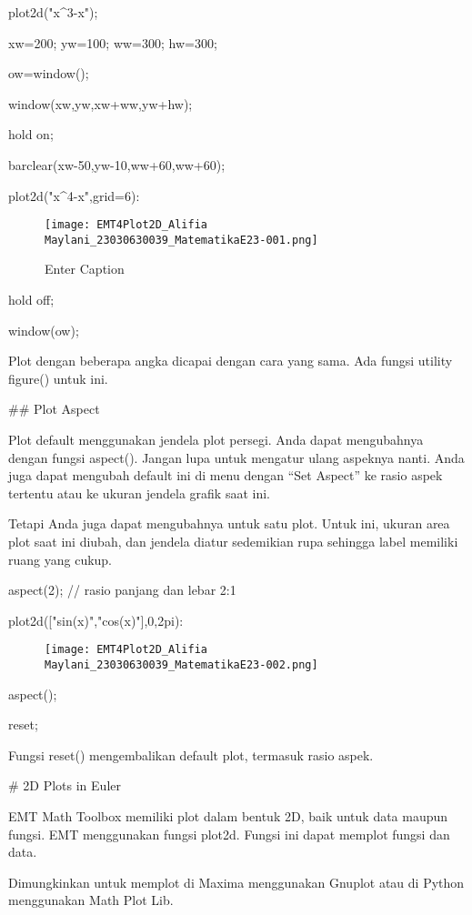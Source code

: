 \documentclass{article}
\begin{document}
\>plot2d("x^3-x");

\>xw=200; yw=100; ww=300; hw=300;

\>ow=window();

\>window(xw,yw,xw+ww,yw+hw);

\>hold on;

\>barclear(xw-50,yw-10,ww+60,ww+60);

\>plot2d("x^4-x",grid=6):

\begin{figure}
    \centering
    \texttt{[image: EMT4Plot2D\_Alifia Maylani\_23030630039\_MatematikaE23-001.png]}
    \caption{Enter Caption}
    \label{fig:enter-label}
\end{figure}


\>hold off;

\>window(ow);


Plot dengan beberapa angka dicapai dengan cara yang sama. Ada fungsi
utility figure() untuk ini.


## Plot Aspect

Plot default menggunakan jendela plot persegi. Anda dapat mengubahnya
dengan fungsi aspect(). Jangan lupa untuk mengatur ulang aspeknya
nanti. Anda juga dapat mengubah default ini di menu dengan “Set
Aspect” ke rasio aspek tertentu atau ke ukuran jendela grafik saat
ini.


Tetapi Anda juga dapat mengubahnya untuk satu plot. Untuk ini, ukuran
area plot saat ini diubah, dan jendela diatur sedemikian rupa sehingga
label memiliki ruang yang cukup.


\>aspect(2); // rasio panjang dan lebar 2:1

\>plot2d(["sin(x)","cos(x)"],0,2pi):


\begin{figure}
    \centering
    \texttt{[image: EMT4Plot2D\_Alifia Maylani\_23030630039\_MatematikaE23-002.png]}
    \caption{}
    \label{fig:enter-label}
\end{figure}

\>aspect();

\>reset;


Fungsi reset() mengembalikan default plot, termasuk rasio aspek.


# 2D Plots in Euler

EMT Math Toolbox memiliki plot dalam bentuk 2D, baik untuk data maupun
fungsi. EMT menggunakan fungsi plot2d. Fungsi ini dapat memplot fungsi
dan data.


Dimungkinkan untuk memplot di Maxima menggunakan Gnuplot atau di
Python menggunakan Math Plot Lib.
\end{document}
